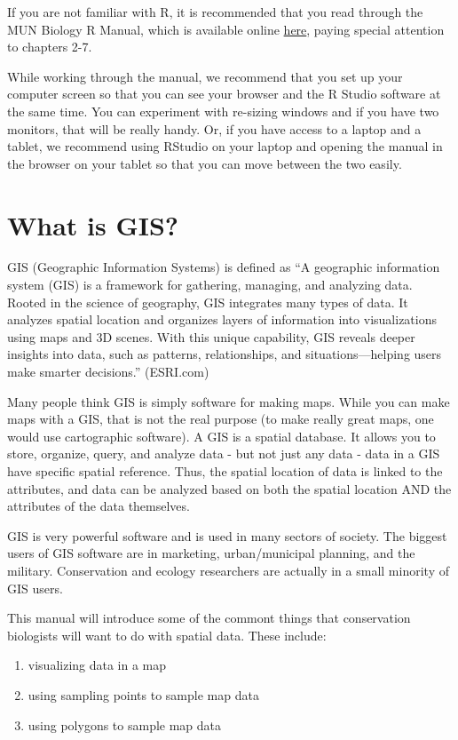 \documentclass[
]{book}
\providecommand{\tightlist}{%
  \setlength{\itemsep}{0pt}\setlength{\parskip}{0pt}}
\begin{document}
If you are not familiar with R, it is recommended that you read through the MUN Biology R Manual, which is available online \href{https://ahurford.github.io/quant-guide-all-courses/}{here}, paying special attention to chapters 2-7.

While working through the manual, we recommend that you set up your computer screen so that you can see your browser and the R Studio software at the same time. You can experiment with re-sizing windows and if you have two monitors, that will be really handy. Or, if you have access to a laptop and a tablet, we recommend using RStudio on your laptop and opening the manual in the browser on your tablet so that you can move between the two easily.

\hypertarget{whatIs}{%
\chapter{What is GIS?}\label{whatIs}}

GIS (Geographic Information Systems) is defined as ``A geographic information system (GIS) is a framework for gathering, managing, and analyzing data. Rooted in the science of geography, GIS integrates many types of data. It analyzes spatial location and organizes layers of information into visualizations using maps and 3D scenes. With this unique capability, GIS reveals deeper insights into data, such as patterns, relationships, and situations---helping users make smarter decisions.'' (ESRI.com)

Many people think GIS is simply software for making maps. While you can make maps with a GIS, that is not the real purpose (to make really great maps, one would use cartographic software). A GIS is a spatial database. It allows you to store, organize, query, and analyze data - but not just any data - data in a GIS have specific spatial reference. Thus, the spatial location of data is linked to the attributes, and data can be analyzed based on both the spatial location AND the attributes of the data themselves.

GIS is very powerful software and is used in many sectors of society. The biggest users of GIS software are in marketing, urban/municipal planning, and the military. Conservation and ecology researchers are actually in a small minority of GIS users.

This manual will introduce some of the commont things that conservation biologists will want to do with spatial data. These include:

\begin{enumerate}
\def\labelenumi{\arabic{enumi}.}
\tightlist
\item
  visualizing data in a map
\item
  using sampling points to sample map data
\item
  using polygons to sample map data
\end{enumerate}
\end{document}
